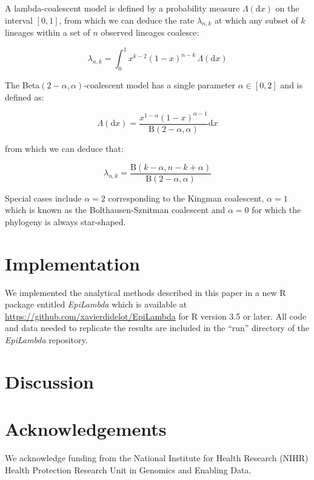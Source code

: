 \documentclass{article}
\begin{document}
A lambda-coalescent model is defined by a probability measure 
$\Lambda(\mathrm{d} x)$ on the interval $[0,1]$, from which we can deduce
the rate $\lambda_{n,k}$ at which any subset of $k$ lineages within a set of $n$ observed lineages 
coalesce:

\begin{equation}
    \lambda_{n,k} = \int_{0}^{1}{x^{k-2}(1-x)^{n-k}\,\Lambda(\mathrm{d} x)}
\end{equation}

The Beta$(2-\alpha,\alpha)$-coalescent model \citep{schweinsbergCoalescentProcessesObtained2003}
has a single parameter $\alpha \in [0,2]$ and is defined as:

\begin{equation}
\Lambda(\mathrm{d}x)=\frac{x^{1-\alpha}(1-x)^{\alpha-1}}{\mathrm{B}(2-\alpha,\alpha)}\mathrm{d}x
\end{equation}

from which we can deduce that:

\begin{equation}
\lambda_{n,k}=\frac{\mathrm{B}(k-\alpha,n-k+\alpha)}{\mathrm{B}(2-\alpha,\alpha)}
\end{equation}

Special cases include $\alpha=2$ corresponding to the Kingman coalescent,
$\alpha=1$ which is known as the Bolthausen-Sznitman coalescent
and $\alpha=0$ for which the phylogeny is always star-shaped.

\section{Implementation}

We implemented the analytical methods described in this paper in a 
new R package entitled \emph{EpiLambda} which is available
at \url{https://github.com/xavierdidelot/EpiLambda} for R version 3.5 or later. 
All code and data needed to replicate the results are included in the ``run'' directory of the \emph{EpiLambda} repository.

\section{Discussion}

\section*{Acknowledgements}

We acknowledge funding from the National Institute for Health Research (NIHR) Health Protection Research Unit in Genomics and Enabling Data.

\newpage

%

\end{document}
